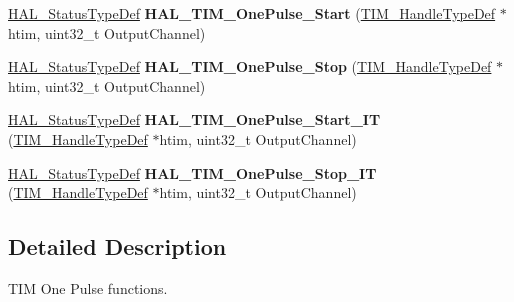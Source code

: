 \begin{DoxyCompactItemize}
\mbox{\label{group___t_i_m___exported___functions___group5_ga40e43e4f2484df59079e0316d6a6fd23}} 
\hyperlink{stm32f4xx__hal__def_8h_a63c0679d1cb8b8c684fbb0632743478f}{H\+A\+L\+\_\+\+Status\+Type\+Def} {\bfseries H\+A\+L\+\_\+\+T\+I\+M\+\_\+\+One\+Pulse\+\_\+\+Start} (\hyperlink{struct_t_i_m___handle_type_def}{T\+I\+M\+\_\+\+Handle\+Type\+Def} $\ast$htim, uint32\+\_\+t Output\+Channel)
\item 
\mbox{\label{group___t_i_m___exported___functions___group5_gac7744a2a063e8bf2909319d70fc764fd}} 
\hyperlink{stm32f4xx__hal__def_8h_a63c0679d1cb8b8c684fbb0632743478f}{H\+A\+L\+\_\+\+Status\+Type\+Def} {\bfseries H\+A\+L\+\_\+\+T\+I\+M\+\_\+\+One\+Pulse\+\_\+\+Stop} (\hyperlink{struct_t_i_m___handle_type_def}{T\+I\+M\+\_\+\+Handle\+Type\+Def} $\ast$htim, uint32\+\_\+t Output\+Channel)
\item 
\mbox{\label{group___t_i_m___exported___functions___group5_gafcde302725d20c6f992f26660d491bb9}} 
\hyperlink{stm32f4xx__hal__def_8h_a63c0679d1cb8b8c684fbb0632743478f}{H\+A\+L\+\_\+\+Status\+Type\+Def} {\bfseries H\+A\+L\+\_\+\+T\+I\+M\+\_\+\+One\+Pulse\+\_\+\+Start\+\_\+\+IT} (\hyperlink{struct_t_i_m___handle_type_def}{T\+I\+M\+\_\+\+Handle\+Type\+Def} $\ast$htim, uint32\+\_\+t Output\+Channel)
\item 
\mbox{\label{group___t_i_m___exported___functions___group5_ga6bbce5414404228fde71dadd8d1cddc7}} 
\hyperlink{stm32f4xx__hal__def_8h_a63c0679d1cb8b8c684fbb0632743478f}{H\+A\+L\+\_\+\+Status\+Type\+Def} {\bfseries H\+A\+L\+\_\+\+T\+I\+M\+\_\+\+One\+Pulse\+\_\+\+Stop\+\_\+\+IT} (\hyperlink{struct_t_i_m___handle_type_def}{T\+I\+M\+\_\+\+Handle\+Type\+Def} $\ast$htim, uint32\+\_\+t Output\+Channel)
\end{DoxyCompactItemize}


\subsection{Detailed Description}
T\+IM One Pulse functions. 

